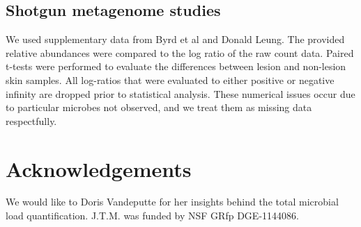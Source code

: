 \subsection{Shotgun metagenome studies}
We used supplementary data from Byrd et al \cite{Byrd2017-eb} and Donald Leung\cite{Leung-DYM}. The provided relative abundances were compared to the log ratio of the raw count data. Paired t-tests were performed to evaluate the differences between lesion and non-lesion skin samples.
All log-ratios that were evaluated to either positive or negative infinity are dropped prior to statistical analysis.
These numerical issues occur due to particular microbes not observed, and we treat them as missing data respectfully.

\section{Acknowledgements}
We would like to Doris Vandeputte for her insights behind the total microbial load quantification.
J.T.M. was funded by NSF GR\gls{fp} DGE-1144086.
